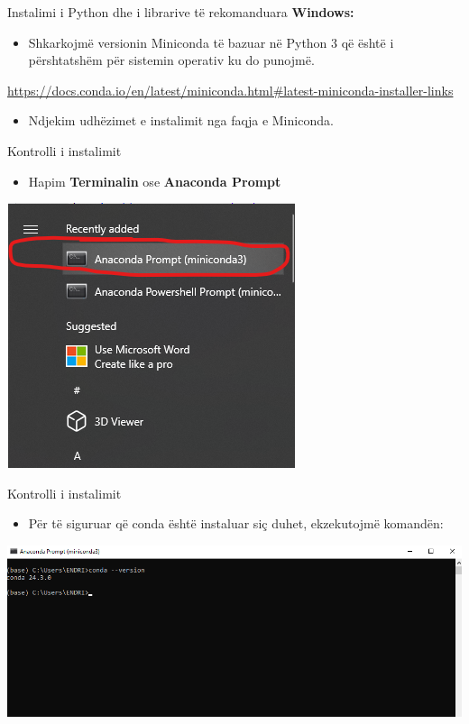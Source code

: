\documentclass[
  ignorenonframetext,
]{beamer}
\providecommand{\tightlist}{%
  \setlength{\itemsep}{0pt}\setlength{\parskip}{0pt}}
\begin{document}
\begin{frame}{Instalimi i Python dhe i librarive të rekomanduara}
\protect\hypertarget{instalimi-i-python-dhe-i-librarive-tuxeb-rekomanduara}{}
\textbf{Windows:}

\begin{itemize}
\tightlist
\item
  Shkarkojmë versionin Miniconda të bazuar në Python 3 që është i
  përshtatshëm për sistemin operativ ku do punojmë.
\end{itemize}

\url{https://docs.conda.io/en/latest/miniconda.html\#latest-miniconda-installer-links}

\begin{itemize}
\tightlist
\item
  Ndjekim udhëzimet e instalimit nga faqja e Miniconda.
\end{itemize}
\end{frame}

\begin{frame}{Kontrolli i instalimit}
\protect\hypertarget{kontrolli-i-instalimit}{}
\begin{itemize}
\tightlist
\item
  Hapim \textbf{Terminalin} ose \textbf{Anaconda Prompt}
\end{itemize}

\includegraphics{./Figs/anac_prompt.png}
\end{frame}

\begin{frame}{Kontrolli i instalimit}
\protect\hypertarget{kontrolli-i-instalimit-1}{}
\begin{itemize}
\tightlist
\item
  Për të siguruar që conda është instaluar siç duhet, ekzekutojmë
  komandën:
\end{itemize}

\includegraphics{./Figs/conda_ver.png}
\end{frame}
\end{document}
